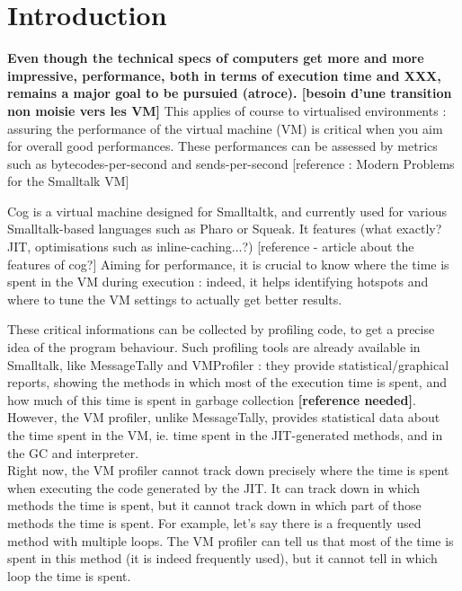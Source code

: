 \documentclass[10pt,reprint]{sigplanconf}
\begin{document}

\section{Introduction}

\textbf{Even though the technical specs of computers get more and more impressive, performance, both in terms of execution time and XXX, remains a major goal to be pursuied (atroce).
[besoin d'une transition non moisie vers les VM]}
This applies of course to virtualised environments : assuring the performance of the virtual machine (VM) is critical when you aim for overall good performances. These performances can be assessed by metrics such as bytecodes-per-second and sends-per-second [reference : Modern Problems for the Smalltalk VM] 

Cog is a virtual machine designed for Smalltaltk, and currently used for various Smalltalk-based languages such as Pharo or Squeak. It features (what exactly? JIT, optimisations such as inline-caching...?) [reference - article about the features of cog?]
Aiming for performance, it is crucial to know where the time is spent in the VM during execution : indeed, it helps identifying hotspots and where to tune the VM settings to actually get better results.

These critical informations can be collected by profiling code, to get a precise idea of the program behaviour. Such profiling tools are already available in Smalltalk, like MessageTally and VMProfiler : they provide statistical/graphical reports, showing the methods in which most of the execution time is spent, and how much of this time is spent in garbage collection \textbf{[reference needed]}. However, the VM profiler, unlike MessageTally, provides statistical data about the time spent in the VM, ie. time spent in the JIT-generated methods, and in the GC and interpreter.\\

Right now, the VM profiler cannot track down precisely where the time is spent when executing the code generated by the JIT. It can track down in which methods the time is spent, but it cannot track down in which part of those methods the time is spent. For example, let’s say there is a frequently used method with multiple loops. The VM profiler can tell us that most of the time is spent in this method (it is indeed frequently used), but it cannot tell in which loop the time is spent.
\end{document}

